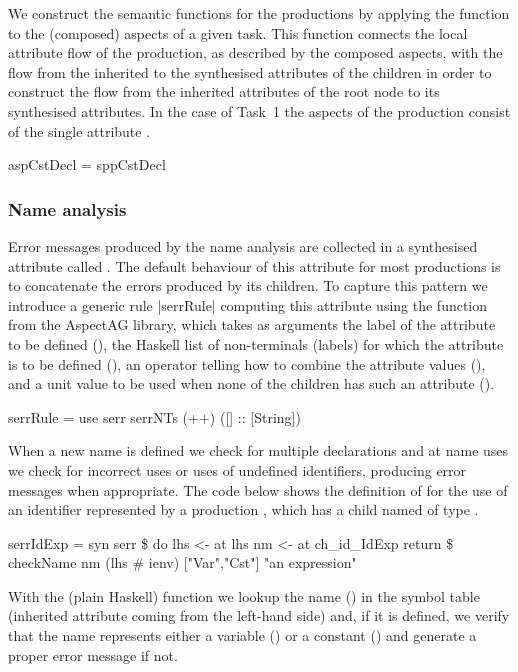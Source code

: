 We construct the semantic functions for the productions by applying the  function to the
(composed) aspects of a given task. This function connects the local attribute flow of the production, as described by the composed aspects, with the flow from the inherited to the synthesised attributes of the children in order to construct the flow from the inherited attributes of the root node to its synthesised  attributes.
In the case of Task~1 the aspects of the production   consist of the single attribute .
\begin{haskell}
aspCstDecl = sppCstDecl
\end{haskell}


\subsubsection{Name analysis}
Error messages produced by the name analysis are collected in 
a synthesised attribute called .
The default behaviour of this attribute for most  productions is to concatenate the errors produced by 
its children.
To capture this pattern we introduce a generic rule |serrRule| computing this attribute using the  function  from the AspectAG library, 
which takes as arguments the label of the attribute to be defined (), 
the Haskell list of non-terminals (labels) for which the attribute is to be defined (), 
an operator telling how to  combine the attribute values (\texthaskell{++}), 
and a unit value to be used when none of the children has such an attribute ().
\begin{haskell}
serrRule = use serr serrNTs (++) ([] :: [String]) 
\end{haskell}
When a new name is defined we check for multiple declarations and at
name uses we check for incorrect uses or uses of undefined identifiers, producing error messages when appropriate.
The code below shows the definition of  for the use of an identifier
represented by a production
, which has a child named  of type .
\begin{haskell}
serrIdExp = syn serr \$ do 
    lhs <- at lhs
    nm  <- at ch_id_IdExp
    return \$ checkName nm (lhs # ienv) ["Var","Cst"] "an expression"
\end{haskell}
With the (plain Haskell) function  we lookup the name () 
in the symbol table (inherited attribute  coming from the left-hand side)
and, if it is defined, we verify that the name represents either a variable () 
or a constant () and generate  a proper error message if not.

